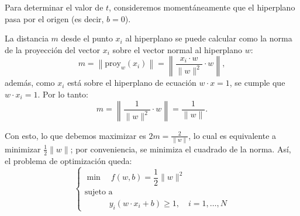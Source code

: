 \documentclass[a4,11pt]{aleph-notas}
\begin{document}
Para determinar el valor de $t$, consideremos momentáneamente que el hiperplano pasa por el origen (es decir, $b=0$).
\begin{center}
\end{center}

La distancia $m$ desde el punto $x_i$ al hiperplano se puede calcular como la norma de la proyección del vector ${x}_i$ sobre el vector normal al hiperplano ${w}$:
\[
    m 
    = \left\| \text{proy}_{{w}}({x_i}) \right\|
    = \left\| \frac{{x_i} \cdot {w}}{\|{w}\|^2} \cdot {w} \right\|,
\]
además, como $x_i$ está sobre el hiperplano de ecuación ${w} \cdot {x} = 1$, se cumple que ${w} \cdot {x}_i = 1$. Por lo tanto:
\[
    m 
    = \left\| \frac{1}{\|{w}\|^2} \cdot {w} \right\| 
    = \frac{1}{\|{w}\|}.
\]

Con esto, lo que debemos maximizar es $2m = \frac{2}{\|{w}\|}$, lo cual es equivalente a minimizar $\frac{1}{2} \|{w}\|$; por conveniencia, se minimiza el cuadrado de la norma. Así, el problema de optimización queda:
\[
    \begin{cases}
        \min \quad f(w,b) = \dfrac{1}{2} \|{w}\|^2 \\
        \text{sujeto a}\\ \qquad\quad y_i ({w} \cdot {x}_i + b) \geq 1, \quad i = 1,\ldots, N
    \end{cases}
\]
\end{document}
